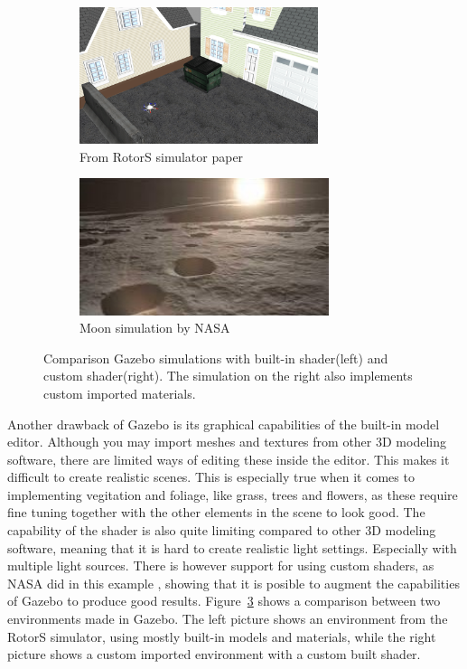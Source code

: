 \begin{figure}[!htb]
    \centering
    \begin{subfigure}{0.45\textwidth}
        \includegraphics[height=4cm]{rapport/fig/Simulator/A-screenshot-of-the-RotorS-simulator-The-scene-is-built-up-from-Gazebo-default-models.png}
        \caption{From RotorS simulator paper \cite{RotorS}}
        \label{fig:A}
    \end{subfigure}
    \begin{subfigure}{0.45\textwidth}
        \includegraphics[height=4cm]{rapport/fig/Simulator/gazebomoon.jpg}
        \caption{Moon simulation by NASA \cite{NASAGazeboppt}}
        \label{fig:NASA_Gazebo_moon}
    \end{subfigure}
    \caption{Comparison Gazebo simulations with built-in shader(left) and custom shader(right). The simulation on the right also implements custom imported materials.}
    \label{fig:Gazebo_imgs}
\end{figure}

Another drawback of Gazebo is its graphical capabilities of the built-in model editor. Although you may import meshes and textures from other 3D modeling software, there are limited ways of editing these inside the editor. This makes it difficult to create realistic scenes. This is especially true when it comes to implementing vegitation and foliage, like grass, trees and flowers, as these require fine tuning together with the other elements in the scene to look good. The capability of the shader is also quite limiting compared to other 3D modeling software, meaning that it is hard to create realistic light settings. Especially with multiple light sources. There is however support for using custom shaders, as NASA did in this example \cite{NASAGazeboppt}, showing that it is posible to augment the capabilities of Gazebo to produce good results. Figure~\ref{fig:Gazebo_imgs} shows a comparison between two environments made in Gazebo. The left picture shows an environment from the RotorS simulator, using mostly built-in models and materials, while the right picture shows a custom imported environment with a custom built shader.

